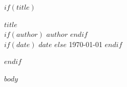 \documentclass[11pt, a4paper]{article}
\begin{document}
$if(title)$
\begin{center}
    {\Huge \textbf{$title$}} \\ \vspace{5pt} 
$if(author)$
    $author$
$endif$
    \\ \vspace{5pt} 
$if(date)$
    $date$
$else$
    \today
$endif$
\end{center}
\vspace{0.5cm}
$endif$


$body$
\end{document}
